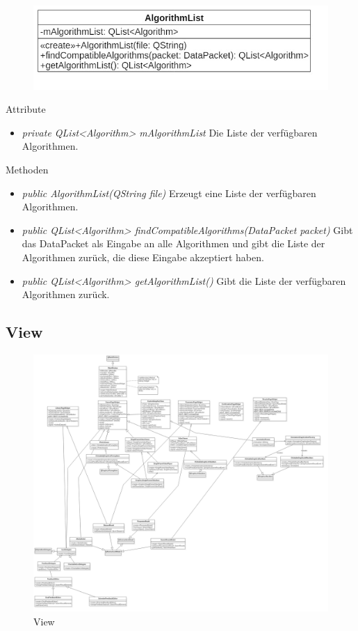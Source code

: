 \begin{figure}[H]
\centering
\includegraphics[scale=0.5]{img/Klassendiagramm/Klassen/Model/AlgorithmList}
\label{fig:algorithmList}
\end{figure}

Attribute
\begin{itemize}
\item\textit{private QList<Algorithm> mAlgorithmList} Die Liste der verfügbaren Algorithmen.
\end{itemize}

Methoden
\begin{itemize}
\item\textit{public AlgorithmList(QString file)} Erzeugt eine Liste der verfügbaren Algorithmen.
\item\textit{public QList<Algorithm> findCompatibleAlgorithms(DataPacket packet)} Gibt das DataPacket als Eingabe an alle Algorithmen und gibt die Liste der Algorithmen zurück, die diese Eingabe akzeptiert haben.
\item\textit{public QList<Algorithm> getAlgorithmList()} Gibt die Liste der verfügbaren Algorithmen zurück.
\end{itemize}

\pagebreak

\subsection{View}

\begin{figure}[H]
\includegraphics[width=1\linewidth]{img/Klassendiagramm/View}
\caption{View}
\label{fig:view}
\end{figure}


